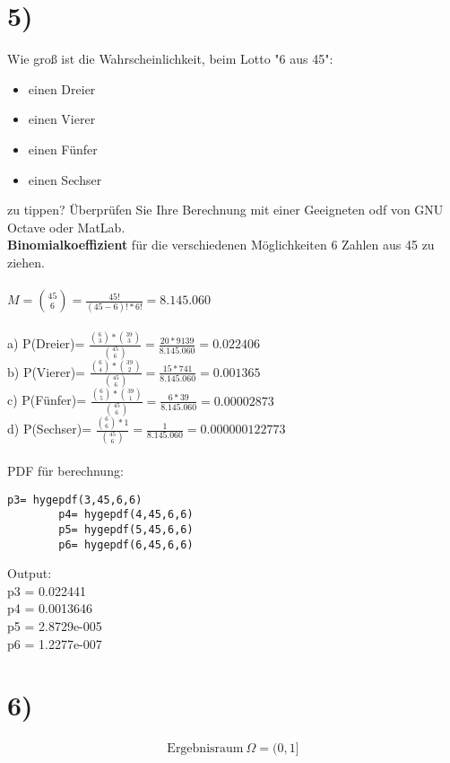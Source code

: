 \documentclass[11pt,a4paper]{article}
\begin{document}
	\section*{5)}
	Wie groß ist die Wahrscheinlichkeit, beim Lotto "6 aus 45":
	\begin{itemize}
		\item einen Dreier
		\item einen Vierer
		\item einen Fünfer
		\item einen Sechser
	\end{itemize}
	zu tippen? Überprüfen Sie Ihre Berechnung mit einer Geeigneten odf von GNU Octave oder MatLab.\\

	\textbf{Binomialkoeffizient} für die verschiedenen Möglichkeiten 6 Zahlen aus 45 zu ziehen.\\\\
	\(M=\binom{45}{6} =\frac{45!}{(45-6)! * 6!}= 8.145.060\)\\\\
	a) P(Dreier)= \( \frac{\binom{6}{3} * \binom{39}{3}}{\binom{45}{6}}=\frac{20*9139}{8.145.060}=0.022406\)\\
	b) P(Vierer)= \( \frac{\binom{6}{4} * \binom{39}{2}}{\binom{45}{6}}=\frac{15*741}{8.145.060}=0.001365\)\\
	c) P(Fünfer)= \( \frac{\binom{6}{5} * \binom{39}{1}}{\binom{45}{6}}=\frac{6*39}{8.145.060}=0.00002873\)\\
	d) P(Sechser)= \( \frac{\binom{6}{6} * 1}{\binom{45}{6}}=\frac{1}{8.145.060}=0.000000122773\)\\\\
	PDF für berechnung:\\
	\begin{lstlisting}[frame=single]
		p3= hygepdf(3,45,6,6)
		p4= hygepdf(4,45,6,6)
		p5= hygepdf(5,45,6,6)
		p6= hygepdf(6,45,6,6)
	\end{lstlisting}
	Output:\\
	p3 =  0.022441\\
	p4 =  0.0013646\\
	p5 =   2.8729e-005\\
	p6 =   1.2277e-007\\

	\newpage
	\section*{6)}

  \begin{align*}
    \text{Ergebnisraum}\ \Omega = (0,1]
  \end{align*}
\end{document}
